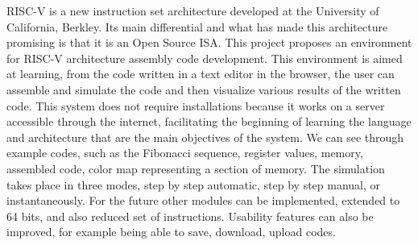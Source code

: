 RISC-V is a new instruction set architecture developed at the University of California, Berkley. Its main differential and what has made this architecture promising is that it is an Open Source ISA. This project proposes an environment for RISC-V architecture assembly code development. This environment is aimed at learning, from the code written in a text editor in the browser, the user can assemble and simulate the code and then visualize various results of the written code. This system does not require installations because it works on a server accessible through the internet, facilitating the beginning of learning the language and architecture that are the main objectives of the system. We can see through example codes, such as the Fibonacci sequence, register values, memory, assembled code, color map representing a section of memory. The simulation takes place in three modes, step by step automatic, step by step manual, or instantaneously. For the future other modules can be implemented, extended to 64 bits, and also reduced set of instructions. Usability features can also be improved, for example being able to save, download, upload codes.